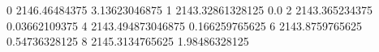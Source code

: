 0 2146.46484375 3.13623046875
1 2143.32861328125 0.0
2 2143.365234375 0.03662109375
4 2143.494873046875 0.166259765625
6 2143.8759765625 0.54736328125
8 2145.3134765625 1.98486328125
